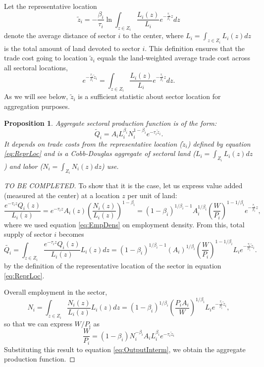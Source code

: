 \documentclass[12pt]{article}
\newtheorem{proposition}{Proposition}
\begin{document}
Let the representative location
\begin{equation}
\label{eq:ReprLoc}
\tilde z_i = -
\frac{\beta_i}{\tau_i}
\ln\int_{z\in Z_i} \frac{L_i(z)}{L_i}e^{-\frac{\tau_i}{\beta_i} z}dz
\end{equation}
denote the average distance of sector $i$ to the center, where $L_i=\int_{z\in Z_i} L_i(z)dz$ is the total amount of land devoted to sector $i$. This definition ensures that the trade cost going to location $\tilde z_i$ equals the land-weighted average trade cost across all sectoral locations,
\[
e^{-\frac{\tau_i}{\beta_i} \tilde z_i} = \int_{z\in Z_i} \frac{L_i(z)}{L_i}e^{-\frac{\tau_i}{\beta_i} z}dz.
\]
As we will see below, $\tilde z_i$ is a sufficient statistic about sector location for aggregation purposes. %

\begin{proposition}
Aggregate sectoral production function is of the form:
\begin{equation}
\tilde Q_i =
A_iL_i^{\beta_i}N_i^{1-\beta_i}
 e^{-\tau_i\tilde z_i}.
\end{equation}
It depends on trade costs from the representative location ($\tilde{z}_i$) defined by equation \eqref{eq:ReprLoc} and is a Cobb-Douglas aggregate of sectoral land ($L_i=\int_{Z_i}L_i(z)dz$) and labor ($N_i=\int_{Z_i}N_i(z)dz$) use.
\end{proposition}
\begin{proof}
[TO BE COMPLETED]
To show that it is the case, let us express value added (measured at the center) at a location $z$ per unit of land:
\[
\frac{e^{-\tau_i z} Q_i(z)}{L_i(z)} = e^{-\tau_i z} A_i(z)\left(\frac{N_i(z)}{L_i(z)}\right)^{1-\beta_i} = (1-\beta_i)^{1/\beta_i-1}
A_i^{1/\beta_i}\left(\frac{W}{P_i}\right)^{1-1/\beta_i}
 e^{-\frac{\tau_i}{\beta_i} z},
\]
where we used equation \ref{eq:EmpDens} on employment density. From this, total supply of sector $i$ becomes
\begin{equation}
\label{eq:OutputInterm}
\tilde{Q_i} = \int_{z\in Z_i}\frac{e^{-\tau_i z} Q_i(z)}{L_i(z)}L_i(z)dz=(1-\beta_i)^{1/\beta_i-1}
(A_i)^{1/\beta_i}\left(\frac{W}{P_i}\right)^{1-1/\beta_i} L_i e^{-\frac{\tau_i}{\beta_i} \tilde z_i}.
\end{equation}
by the definition of the representative location of the sector in equation \ref{eq:ReprLoc}.

Overall employment in the sector,
\[
N_i = \int_{z\in Z_i}\frac{N_i(z)}{L_i(z)}L_i(z)dz= (1-\beta_i)^{1/\beta_i}
\left(\frac{P_iA_i}{W}\right)^{1/\beta_i} L_i e^{-\frac{\tau_i}{\beta_i} \tilde z_i},
\]
so that we can express $W/P_i$ as
\[
\frac{W}{P_i} = (1-\beta_i)
N_i^{-\beta_i}A_i L_i^{\beta_i}
 e^{-\tau_i\tilde z_i}
\]
Substituting this result to equation \ref{eq:OutputInterm}, we obtain the aggregate production function.
\end{proof}
\end{document}
